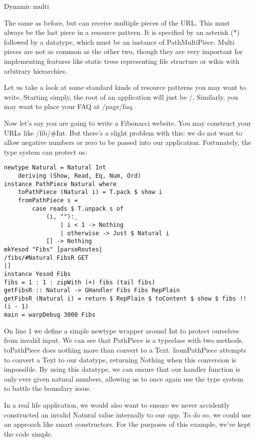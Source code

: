 Dynamic multi

The same as before, but can receive multiple pieces of the URL. This
must always be the last piece in a resource pattern. It is specified
by an asterisk (*) followed by a datatype, which must be an instance
of PathMultiPiece. Multi pieces are not as common as the other two,
though they are very important for implementing features like static
trees representing file structure or wikis with arbitrary
hierarchies.

Let us take a look at some standard kinds of resource patterns you may
want to write. Starting simply, the root of an application will just
be /. Similarly, you may want to place your FAQ at /page/faq.

Now let's say you are going to write a Fibonacci website. You may
construct your URLs like /fib/#Int. But there's a slight problem with
this: we do not want to allow negative numbers or zero to be passed
into our application. Fortunately, the type system can protect us:

\begin{lstlisting}
newtype Natural = Natural Int
    deriving (Show, Read, Eq, Num, Ord)
instance PathPiece Natural where
    toPathPiece (Natural i) = T.pack $ show i
    fromPathPiece s =
        case reads $ T.unpack s of
            (i, ""):_
                | i < 1 -> Nothing
                | otherwise -> Just $ Natural i
            [] -> Nothing
mkYesod "Fibs" [parseRoutes|
/fibs/#Natural FibsR GET
|]
instance Yesod Fibs
fibs = 1 : 1 : zipWith (+) fibs (tail fibs)
getFibsR :: Natural -> GHandler Fibs Fibs RepPlain
getFibsR (Natural i) = return $ RepPlain $ toContent $ show $ fibs !! (i - 1)
main = warpDebug 3000 Fibs
\end{lstlisting}

On line 1 we define a simple newtype wrapper around Int to protect
ourselves from invalid input. We can see that PathPiece is a typeclass
with two methods. toPathPiece does nothing more than convert to a
Text. fromPathPiece attempts to convert a Text to our datatype,
returning Nothing when this conversion is impossible. By using this
datatype, we can ensure that our handler function is only ever given
natural numbers, allowing us to once again use the type system to
battle the boundary issue.

In a real life application, we would also want to ensure we never
accidently constructed an invalid Natural value internally to our
app. To do so, we could use an approach like smart constructors. For
the purposes of this example, we've kept the code simple.

